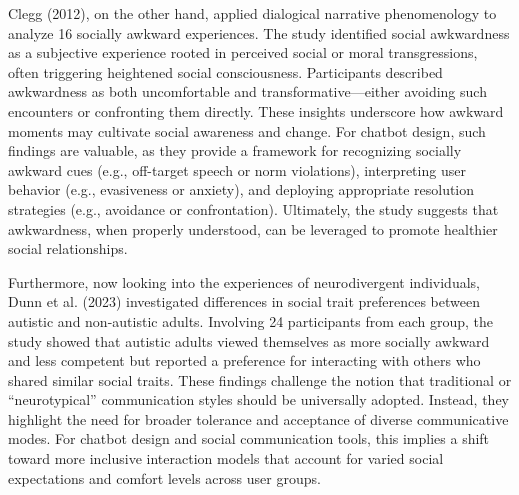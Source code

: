Clegg (2012), on the other hand, applied dialogical narrative phenomenology to analyze 16 socially awkward
experiences. The study identified social awkwardness as a subjective experience rooted in perceived social or moral
transgressions, often triggering heightened social consciousness. Participants described awkwardness as both uncomfortable
and transformative—either avoiding such encounters or confronting them directly. These insights underscore how awkward
moments may cultivate social awareness and change. For chatbot design, such findings are valuable, as they provide a
framework for recognizing socially awkward cues (e.g., off-target speech or norm violations), interpreting user behavior
(e.g., evasiveness or anxiety), and deploying appropriate resolution strategies (e.g., avoidance or confrontation).
Ultimately, the study suggests that awkwardness, when properly understood, can be leveraged to promote healthier social 
relationships.

Furthermore, now looking into the experiences of neurodivergent individuals, Dunn et al. (2023) investigated differences
in social trait preferences between autistic and non-autistic adults. Involving 24 participants from each group, the study
showed that autistic adults viewed themselves as more socially awkward and less competent but reported a preference for
interacting with others who shared similar social traits. These findings challenge the notion that traditional or
“neurotypical” communication styles should be universally adopted. Instead, they highlight the need for broader tolerance
and acceptance of diverse communicative modes. For chatbot design and social communication tools, this implies a
shift toward more inclusive interaction models that account for varied social expectations and comfort levels across 
user groups.


